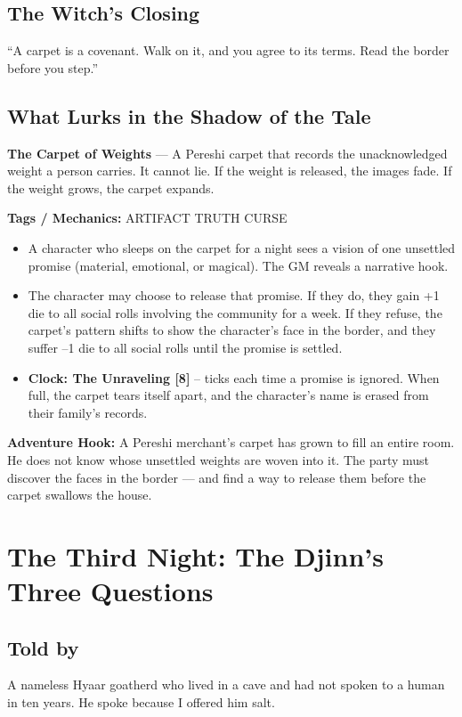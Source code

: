 \documentclass[10pt,twoside]{book}
\newcommand{\tag}[1]{\textsc{#1}}
\begin{document}
\section*{The Witch's Closing}
``A carpet is a covenant. Walk on it, and you agree to its terms. Read the border before you step.''

\section*{What Lurks in the Shadow of the Tale}
\begin{infobox}
\textbf{The Carpet of Weights} --- A Pereshi carpet that records the unacknowledged weight a person carries. It cannot lie. If the weight is released, the images fade. If the weight grows, the carpet expands.

\textbf{Tags / Mechanics:} \tag{ARTIFACT} \tag{TRUTH} \tag{CURSE}

\begin{itemize}
\item A character who sleeps on the carpet for a night sees a vision of one unsettled promise (material, emotional, or magical). The GM reveals a narrative hook.
\item The character may choose to release that promise. If they do, they gain +1 die to all social rolls involving the community for a week. If they refuse, the carpet's pattern shifts to show the character's face in the border, and they suffer --1 die to all social rolls until the promise is settled.
\item \textbf{Clock: The Unraveling [8]} -- ticks each time a promise is ignored. When full, the carpet tears itself apart, and the character's name is erased from their family's records.
\end{itemize}

\textbf{Adventure Hook:} A Pereshi merchant's carpet has grown to fill an entire room. He does not know whose unsettled weights are woven into it. The party must discover the faces in the border --- and find a way to release them before the carpet swallows the house.
\end{infobox}

\chapter{The Third Night: The Djinn's Three Questions}

\section*{Told by}
A nameless Hyaar goatherd who lived in a cave and had not spoken to a human in ten years. He spoke because I offered him salt.
\end{document}
